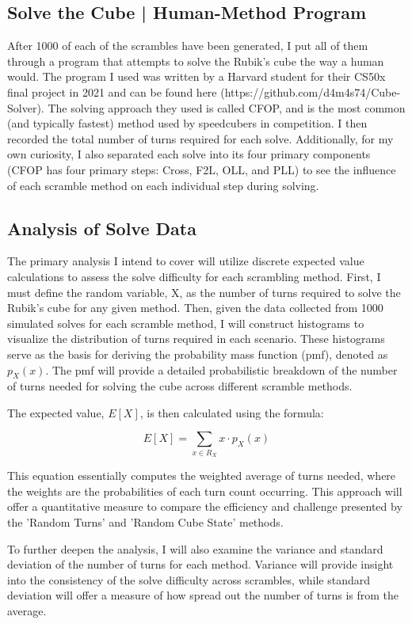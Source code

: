 \documentclass[12pt,letterpaper]{article}
\numberwithin{equation}{section}
\begin{document}
\subsection{Solve the Cube | Human-Method Program}
After 1000 of each of the scrambles have been generated, I put all of them through a program that attempts to solve the Rubik's cube the way a human would. The program I used was written by a Harvard student for their CS50x final project in 2021 and can be found here (https://github.com/d4m4s74/Cube-Solver). The solving approach they used is called CFOP, and is the most common (and typically fastest) method used by speedcubers in competition. I then recorded the total number of turns required for each solve. Additionally, for my own curiosity, I also separated each solve into its four primary components (CFOP has four primary steps: Cross, F2L, OLL, and PLL) to see the influence of each scramble method on each individual step during solving. 

\subsection{Analysis of Solve Data}
The primary analysis I intend to cover will utilize discrete expected value calculations to assess the solve difficulty for each scrambling method. First, I must define the random variable, X, as the number of turns required to solve the Rubik's cube for any given method. Then, given the data collected from 1000 simulated solves for each scramble method, I will construct histograms to visualize the distribution of turns required in each scenario. These histograms serve as the basis for deriving the probability mass function (pmf), denoted as $p_X(x)$. The pmf will provide a detailed probabilistic breakdown of the number of turns needed for solving the cube across different scramble methods.

The expected value, $E[X]$, is then calculated using the formula:

\begin{equation}
E[X] = \sum_{x \in R_X} x \cdot p_X(x)
\end{equation}

This equation essentially computes the weighted average of turns needed, where the weights are the probabilities of each turn count occurring. This approach will offer a quantitative measure to compare the efficiency and challenge presented by the 'Random Turns' and 'Random Cube State' methods.

To further deepen the analysis, I will also examine the variance and standard deviation of the number of turns for each method. Variance will provide insight into the consistency of the solve difficulty across scrambles, while standard deviation will offer a measure of how spread out the number of turns is from the average. 
\end{document}

